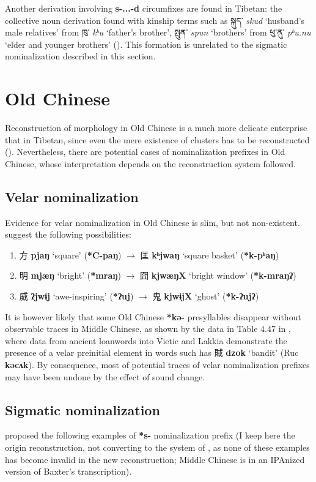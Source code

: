 \documentclass[oneside,a4paper,11pt]{article}
\newcommand{\ipa}[1]{\textbf{{\phon\mbox{#1}}}} %
\newcommand{\zh}[1]{{\cn #1}}
\newcommand{\tibet}[3]{{\tibetain#1} \textit{\phon#2} `#3'}
\newcommand{\zhc}[2]{\zh{#1} \ipa{#2}}
\begin{document}
Another derivation involving \ipa{s-...-d}   circumfixes are found in Tibetan: the collective noun derivation found with kinship terms such as \tibet{སྐུད་}{skud}{husband's male relatives} from  \tibet{ཁུ་}{kʰu}{father's brother}, \tibet{སྤུན་}{spun}{brothers} from  \tibet{ཕུ་ནུ་}{pʰu.nu}{elder and younger brothers} (\citealt{nagano94khu}). This formation is unrelated to the sigmatic nominalization described in this section.

\section{Old Chinese}
Reconstruction of morphology in Old Chinese is a much more delicate enterprise that in Tibetan, since even the mere existence of clusters has to be reconstructed (\citealt{gong17clusters}). Nevertheless, there are potential cases of nominalization prefixes in Old Chinese, whose interpretation depends on the reconstruction system followed.

\subsection{Velar nominalization}
Evidence for velar nominalization in Old Chinese is slim, but not non-existent. \citet[57]{bs14oc} suggest the following possibilities:

\begin{enumerate}
\item \zhc{方}{pjaŋ} ‘square’ (\ipa{*C-paŋ})  $\rightarrow$ \zhc{匡}{kʰjwaŋ} ‘square basket’   (\ipa{*k-pʰaŋ})
\item \zhc{明}{mjæŋ} ‘bright’ (\ipa{*mraŋ})  $\rightarrow$ \zhc{囧}{kjwæŋX} ‘bright window’   (\ipa{*k-mraŋʔ})
\item \zhc{威}{ʔjwɨj} ‘awe-inspiring’ (\ipa{*ʔuj})  $\rightarrow$ \zhc{鬼}{kjwɨjX} ‘ghost’   (\ipa{*k-ʔujʔ})
\end{enumerate}

It is however likely that some Old Chinese \ipa{*kə-} presyllables disappear without observable traces in Middle Chinese, as shown by the data in Table 4.47 in \citet[153]{bs14oc}, where data from ancient loanwords into Vietic and Lakkia demonstrate the presence of a velar preinitial element in words such has \zhc{賊}{dzok} `bandit' (Ruc \ipa{kəcʌk}). By consequence, most of potential traces of velar nominalization prefixes may have been undone by the effect of sound change.

\subsection{Sigmatic nominalization}
\citet[73]{sagart99roc} proposed the following examples of \ipa{*s-} nominalization prefix (I keep here the origin reconstruction, not converting to the system of \citealt{bs14oc}, as none of these examples has become invalid in the new reconstruction; Middle Chinese is in an IPAnized version of Baxter's \citealt{baxter92} transcription).
\end{document}
